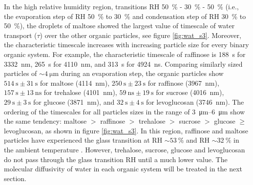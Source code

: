 In the high relative humidity region, transitions RH \SI{50}{\percent} - \SI{30}{\percent} - \SI{50}{\percent} (i.e., the evaporation step of RH \SI{50}{\percent} to \SI{30}{\percent} and condensation step of RH \SI{30}{\percent} to \SI{50}{\percent}), the droplets of maltose showed the largest value of timescale of water transport ($\tau$) over the other organic particles, see figure \ref{fig:wat_s3}. Moreover, the characteristic timescale increases with increasing particle size for every binary organic system. For example, the characteristic timescale of raffinose is \SI{188}{\second} for \SI{3332}{\nano\meter}, \SI{265}{\second} for \SI{4110}{\nano\meter}, and \SI{313}{\second} for \SI{4924}{\nano\second}. Comparing similarly sized particles of $\sim \SI{4}{\micro\meter}$ during an evaporation step, the organic particles show $\SI{514}{\second} \pm \SI{31}{\second}$ for maltose (\SI{4114}{\nano\meter}), $\SI{250}{\second} \pm \SI{23}{\second}$ for raffinose (\SI{3967}{\nano\meter}), $\SI{157}{\second} \pm \SI{13}{\nano\second}$ for trehalose (\SI{4101}{\nano\meter}), $\SI{59}{\nano\second} \pm \SI{19}{\second}$ for sucrose (\SI{4016}{\nano\meter}), $\SI{29}{\second} \pm \SI{3}{\second}$ for glucose (\SI{3871}{\nano\meter}), and $\SI{32}{\second} \pm \SI{4}{\second}$ for levoglucosan (\SI{3746}{\nano\meter}). The ordering of the timescales for all particles sizes in the range of \SIrange[range-phrase=\text{--}]{3}{6}{\micro\meter} show the same tendency: maltose $>$ raffinose $>$ trehalose $>$ sucrose $>$ glucose $\ge$ levoglucosan, as shown in figure \ref{fig:wat_s3}. In this region, raffinose and maltose particles have experienced the glass transition at RH $\sim \SI{53}{\percent}$ and RH $\sim\SI{32}{\percent}$ in the ambient temperature \cite{Song2016a,Tong2011}. However, trehalose, sucrose, glucose and levoglucosan do not pass through the glass transition RH until a much lower value. The molecular diffusivity of water in each organic system will be treated in the next section.

